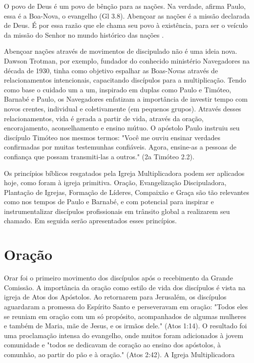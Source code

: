 \documentclass[12pt,openright,oneside,a4paper]{abntex2}
\begin{document}
\begin{citacao}O povo de Deus é um povo de bênção para as nações. Na verdade, afirma Paulo, essa é a Boa-Nova, o evangelho (Gl 3.8). Abençoar as nações é a missão declarada de Deus. É por essa razão que ele chama seu povo à existência, para ser o veículo da missão do Senhor no mundo histórico das nações \cite[p. 98]{wright_missao_2012}.\end{citacao}

Abençoar nações através de movimentos de discipulado não é uma ideia nova. Dawson Trotman, por exemplo, fundador do conhecido ministério Navegadores na década de 1930, tinha como objetivo espalhar as Boas-Novas através de relacionamentos intencionais, capacitando discípulos para a multiplicação. Tendo como base o cuidado um a um, inspirado em duplas como Paulo e Timóteo, Barnabé e Paulo, os Navegadores enfatizam a importância de investir tempo com novos crentes, individual e coletivamente (em pequenos grupos). Através desses relacionamentos, vida é gerada a partir de vida, através da oração, encorajamento, aconselhamento e ensino mútuo\cite[p. 21]{freitas}. O apóstolo Paulo instruiu seu discípulo Timóteo nos mesmos termos: "Você me ouviu ensinar verdades confirmadas por muitas testemunhas confiáveis. Agora, ensine-as a pessoas de confiança que possam transmiti-las a outros." (2a Timóteo 2.2).

Os princípios bíblicos resgatados pela Igreja Multiplicadora podem ser aplicados hoje, como foram à igreja primitiva. Oração, Evangelização Discipuladora, Plantação de Igrejas, Formação de Líderes, Compaixão e Graça são tão relevantes como nos tempos de Paulo e Barnabé, e com potencial para inspirar e instrumentalizar discípulos profissionais em trânsito global a realizarem seu chamado. Em seguida serão apresentados esses princípios.


\section{Oração}

Orar foi o primeiro movimento dos discípulos após o recebimento da Grande Comissão\cite[p. 28]{brandao}. A importância da oração como estilo de vida dos discípulos é vista na igreja de Atos dos Apóstolos. Ao retornarem para Jerusalém, os discípulos aguardaram a promessa do Espírito Santo e perseveravam em oração: "Todos eles se reuniam em oração com um só propósito, acompanhados de algumas mulheres e também de Maria, mãe de Jesus, e os irmãos dele." (Atos 1:14). O resultado foi uma proclamação intensa do evangelho, onde muitos foram adicionados à jovem comunidade e "todos se dedicavam de coração ao ensino dos apóstolos, à comunhão, ao partir do pão e à oração." (Atos 2:42). A Igreja Multiplicadora 
\end{document}
